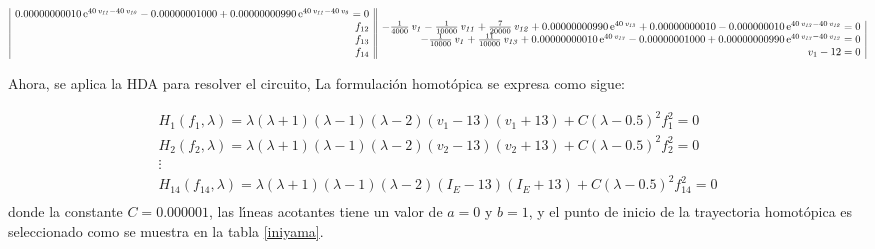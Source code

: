 \documentclass[conference,letterpaper,onecolumn]{IEEEtran}
\begin{document}
{{\begin{equation}
\begin{array}{|r||r|}
 0.00000000010\,{{\rm e}^{40\,{\it v_{11}}-40\,{\it v_{10}}}}- 0.00000001000
+ 0.00000000990\,{{\rm e}^{40\,{\it v_{11}}-40\,{\it v_9}}}=0 \\
f_{12} & -{\frac {1}{4000}}\,{\it v_1}-{\frac {1}{10000}}\,{\it v_{11}}+{\frac {7}{
20000}}\,{\it v_{12}}+ 0.00000000990\,{{\rm e}^{40\,{\it v_{13}}}}+
 0.00000000010- 0.000000010\,{{\rm e}^{40\,{\it v_{13}}-40\,{\it v_{12}}}}=0 \\
f_{13} & -{\frac {1}{10000}}\,{\it v_1}+{\frac {11}{10000}}\,{\it v_{13}}+
 0.00000000010\,{{\rm e}^{40\,{\it v_{13}}}}- 0.00000001000+
 0.00000000990\,{{\rm e}^{40\,{\it v_{13}}-40\,{\it v_{12}}}}=0 \\
 f_{14} & v_1-12=0 \\
\end{array}
\label{eqsd}
\end{equation}}

Ahora, se aplica la  HDA para resolver el circuito,
La formulaci\'on homot\'opica se expresa como sigue:

\begin{displaymath}
\begin{array}{c}
H_1(f_1,\lambda)=\lambda(\lambda+1)(\lambda-1)(\lambda-2)(v_1-13)(v_1+13)+C(\lambda-0.5)^2 f_1^2=0\\
H_2(f_2,\lambda)=\lambda(\lambda+1)(\lambda-1)(\lambda-2)(v_2-13)(v_2+13)+C(\lambda-0.5)^2 f_2^2=0\\
\vdots \\
H_{14}(f_{14},\lambda)=\lambda(\lambda+1)(\lambda-1)(\lambda-2)(I_E-13)(I_E+13)+C(\lambda-0.5)^2 f_{14}^2=0\\
\end{array}
\end{displaymath}
donde la constante $C=0.000001$, las l\'{\i}neas acotantes tiene un valor de $a=0$ y $b=1$, y el punto
de inicio de la trayectoria homot\'opica es seleccionado como se muestra en la tabla \ref{iniyama}.

\begin{table}[tbp]
{\small
{}
}
\caption{Punto de inicio y punto final}
\label{iniyama}
\end{table}


}
\end{document}
